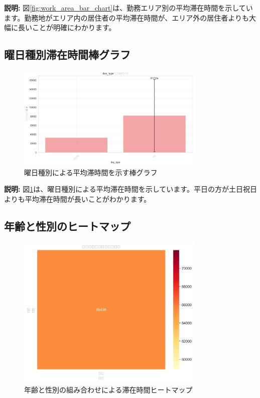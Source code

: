 \documentclass[11pt,a4paper]{article}
\begin{document}
\textbf{説明:}
図\ref{fig:work_area_bar_chart}は、勤務エリア別の平均滞在時間を示しています。勤務地がエリア内の居住者の平均滞在時間が、エリア外の居住者よりも大幅に長いことが明確にわかります。

\subsection{曜日種別滞在時間棒グラフ}

\begin{figure}[H]
    \centering
    \includegraphics[width=0.8\textwidth]{images/day_type_bar_chart.png}
    \caption{曜日種別による平均滞時間を示す棒グラフ}
    \label{fig:day_type_bar_chart}
\end{figure}

\textbf{説明:}
図\ref{fig:day_type_bar_chart}は、曜日種別による平均滞在時間を示しています。平日の方が土日祝日よりも平均滞在時間が長いことがわかります。

\subsection{年齢と性別のヒートマップ}

\begin{figure}[H]
    \centering
    \includegraphics[width=0.8\textwidth]{images/age_gender_heatmap.png}
    \caption{年齢と性別の組み合わせによる滞在時間ヒートマップ}
    \label{fig:age_gender_heatmap}
\end{figure}
\end{document}
